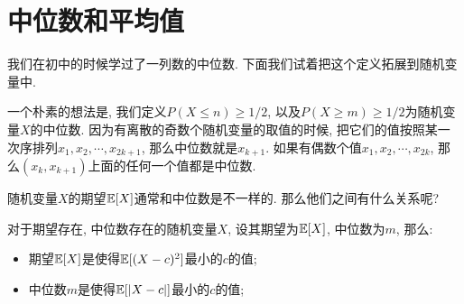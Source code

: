 \section{中位数和平均值}

我们在初中的时候学过了一列数的中位数. 下面我们试着把这个定义拓展到随机变量中. 

一个朴素的想法是, 我们定义$P(X\leq n)\geq 1/2$, 以及$P(X\geq m)\geq 1/2$为随机变量$X$的中位数. 因为有离散的奇数个随机变量的取值的时候, 把它们的值按照某一次序排列$x_1, x_2, \cdots, x_{2k+1}$, 那么中位数就是$x_{k+1}$. 如果有偶数个值$x_1, x_2, \cdots, x_{2k}$, 那么$(x_k, x_{k+1})$上面的任何一个值都是中位数. 

随机变量$X$的期望$\mathbb E[X]$通常和中位数是不一样的. 那么他们之间有什么关系呢? 

\begin{theorem}
    对于期望存在, 中位数存在的随机变量$X$, 设其期望为$\mathbb E[X]$, 中位数为$m$, 那么: 
    \begin{itemize}
        \item 期望$\mathbb E[X]$是使得$\mathbb E[(X-c)^2]$最小的$c$的值;
        \item 中位数$m$是使得$\mathbb E[|X-c|]$最小的$c$的值;
    \end{itemize}
\end{theorem}

